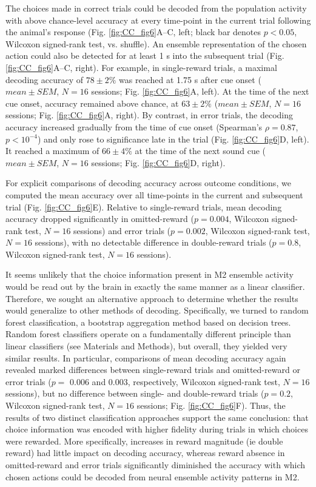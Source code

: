The choices made in correct trials could be decoded from the population activity with above chance-level accuracy at every time-point in the current trial following the animal’s response (Fig. \ref{fig:CC_fig6}A–C, left; black bar denotes $p < 0.05$, Wilcoxon signed-rank test, vs. shuffle). An ensemble representation of the chosen action could also be detected for at least 1 s into the subsequent trial (Fig. \ref{fig:CC_fig6}A–C, right). For example, in single-reward trials, a maximal decoding accuracy of $78 \pm 2\%$ was reached at 1.75 s after cue onset ($\mathit{mean}\pm\mathit{SEM}$, $N = 16$ sessions; Fig. \ref{fig:CC_fig6}A, left). At the time of the next cue onset, accuracy remained above chance, at $63 \pm 2\%$ ($\mathit{mean}\pm\mathit{SEM}$, $N = 16$ sessions; Fig. \ref{fig:CC_fig6}A, right). By contrast, in error trials, the decoding accuracy increased gradually from the time of cue onset (Spearman's $\rho = 0.87$, $p < 10^{-4}$) and only rose to significance late in the trial (Fig. \ref{fig:CC_fig6}D, left). It reached a maximum of $66 \pm 4\%$ at the time of the next sound cue ($\mathit{mean}\pm\mathit{SEM}$, $N = 16$ sessions; Fig. \ref{fig:CC_fig6}D, right).



For explicit comparisons of decoding accuracy across outcome conditions, we computed the mean accuracy over all time-points in the current and subsequent trial (Fig. \ref{fig:CC_fig6}E). Relative to single-reward trials, mean decoding accuracy dropped significantly in omitted-reward ($p = 0.004$, Wilcoxon signed-rank test, $N = 16$ sessions) and error trials ($p = 0.002$, Wilcoxon signed-rank test, $N = 16$ sessions), with no detectable difference in double-reward trials ($p = 0.8$, Wilcoxon signed-rank test, $N = 16$ sessions).

It seems unlikely that the choice information present in M2 ensemble activity would be read out by the brain in exactly the same manner as a linear classifier. Therefore, we sought an alternative approach to determine whether the results would generalize to other methods of decoding. Specifically, we turned to random forest classification, a bootstrap aggregation method based on decision trees. Random forest classifiers operate on a fundamentally different principle than linear classifiers (see Materials and Methods), but overall, they yielded very similar results. In particular, comparisons of mean decoding accuracy again revealed marked differences between single-reward trials and omitted-reward or error trials ($p =$ 0.006 and 0.003, respectively, Wilcoxon signed-rank test, $N = 16$ sessions), but no difference between single- and double-reward trials ($p = 0.2$, Wilcoxon signed-rank test, $N = 16$ sessions; Fig. \ref{fig:CC_fig6}F). Thus, the results of two distinct classification approaches support the same conclusion: that choice information was encoded with higher fidelity during trials in which choices were rewarded. More specifically, increases in reward magnitude (ie double reward) had little impact on decoding accuracy, whereas reward absence in omitted-reward and error trials significantly diminished the accuracy with which chosen actions could be decoded from neural ensemble activity patterns in M2.

